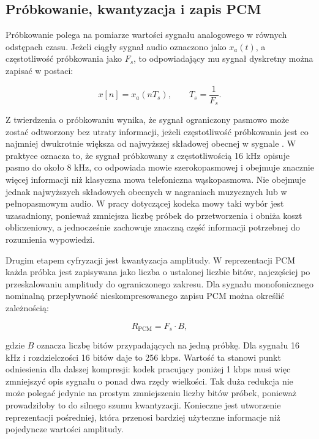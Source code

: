 \subsection{Próbkowanie, kwantyzacja i zapis PCM}
\label{subsec:probkowanie-kwantyzacja-pcm}

Próbkowanie polega na pomiarze wartości sygnału analogowego w równych odstępach czasu. Jeżeli ciągły sygnał audio oznaczono jako \(x_a(t)\), a częstotliwość próbkowania jako \(F_s\), to odpowiadający mu sygnał dyskretny można zapisać w postaci:

\begin{equation}
    x[n] = x_a(nT_s), \qquad T_s = \frac{1}{F_s}.
\end{equation}

Z twierdzenia o próbkowaniu wynika, że sygnał ograniczony pasmowo może zostać odtworzony bez utraty informacji, jeżeli częstotliwość próbkowania jest co najmniej dwukrotnie większa od najwyższej składowej obecnej w sygnale \cite{RabinerSchafer2011SpeechDSP}. W praktyce oznacza to, że sygnał próbkowany z częstotliwością 16 kHz opisuje pasmo do około 8 kHz, co odpowiada mowie szerokopasmowej i obejmuje znacznie więcej informacji niż klasyczna mowa telefoniczna wąskopasmowa. Nie obejmuje jednak najwyższych składowych obecnych w nagraniach muzycznych lub w pełnopasmowym audio. W pracy dotyczącej kodeka mowy taki wybór jest uzasadniony, ponieważ zmniejsza liczbę próbek do przetworzenia i obniża koszt obliczeniowy, a jednocześnie zachowuje znaczną część informacji potrzebnej do rozumienia wypowiedzi.

Drugim etapem cyfryzacji jest kwantyzacja amplitudy. W reprezentacji PCM każda próbka jest zapisywana jako liczba o ustalonej liczbie bitów, najczęściej po przeskalowaniu amplitudy do ograniczonego zakresu. Dla sygnału monofonicznego nominalną przepływność nieskompresowanego zapisu PCM można określić zależnością:

\begin{equation}
    R_{\mathrm{PCM}} = F_s \cdot B,
\end{equation}

gdzie \(B\) oznacza liczbę bitów przypadających na jedną próbkę. Dla sygnału 16 kHz i rozdzielczości 16 bitów daje to 256 kbps. Wartość ta stanowi punkt odniesienia dla dalszej kompresji: kodek pracujący poniżej 1 kbps musi więc zmniejszyć opis sygnału o ponad dwa rzędy wielkości. Tak duża redukcja nie może polegać jedynie na prostym zmniejszeniu liczby bitów próbek, ponieważ prowadziłoby to do silnego szumu kwantyzacji. Konieczne jest utworzenie reprezentacji pośredniej, która przenosi bardziej użyteczne informacje niż pojedyncze wartości amplitudy.

